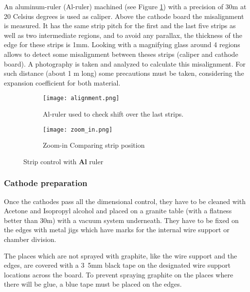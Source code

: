 An aluminum-ruler (Al-ruler) machined (see Figure \ref{fig:ruler}) with a precision of 30\micro m at 20 Celsius degrees is used as
caliper.  Above the cathode board the misalignment is measured. It has the same strip pitch for the first and the last five
strips as well as two intermediate regions, and to avoid any parallax, the thickness of the edge for these strips is 1mm.
Looking with a magnifying glass around 4 regions allows to detect some misalignment between theses strips (caliper
and cathode board). A photography is taken and analyzed to calculate this misalignment. For such distance (about 1 m
long) some precautions must be taken, considering the expansion coefficient for both material.\par 
\begin{figure}[ht]
	\centering
	\hspace*{\fill}
	{\begin{subfigure}[b]{0.35\textwidth}
		\texttt{[image: alignment.png]}
		\caption{Al-ruler used to check shift over the last strips.}
		\label{fig:ruler}
	\end{subfigure}
	}
	\hfill
	{\begin{subfigure}[b]{0.35\textwidth}
		\texttt{[image: zoom\_in.png]}
		\caption{Zoom-in Comparing strip position}
		\label{fig:zoom}
	\end{subfigure}
	}
	\hspace*{\fill}
	\caption{Strip control with {\bf Al} ruler}
\end{figure}

\subsubsection{Cathode preparation}

Once the cathodes pass all the dimensional control, they have to be cleaned with Acetone and Isopropyl alcohol and placed on a
granite table (with a flatness  better than 30\micro m) with a vacuum system underneath. They have to be fixed on the edges with
metal jigs which have marks for the internal wire support or chamber division.\par
The places which are not sprayed with graphite, like the wire support and the edges, are covered with a \unit{3.5}{mm}
black tape on the designated wire support locations across the board. To prevent spraying graphite on the places where
there will be glue, a blue tape must be placed on the edges.

